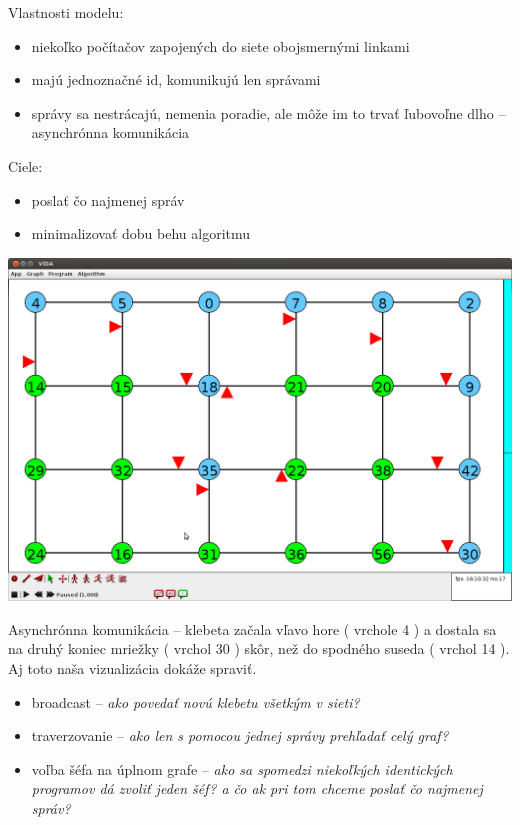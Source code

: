 
Vlastnosti modelu:
\begin{itemize}
    \item niekoľko počítačov zapojených do siete obojsmernými linkami
    \item majú jednoznačné id, komunikujú len správami
    \item správy sa nestrácajú, nemenia poradie, ale môže im to trvať ľubovoľne dlho -- asynchrónna
    komunikácia
\end{itemize}

Ciele:
\begin{itemize}
    \item poslať čo najmenej správ
    \item minimalizovať dobu behu algoritmu
\end{itemize}

\includegraphics[width=\columnwidth]{asyn}
\caption{Asynchrónna komunikácia -- klebeta začala vľavo hore ( vrchole 4 ) a dostala sa na druhý
koniec mriežky ( vrchol 30 ) skôr, než do spodného suseda ( vrchol 14 ). Aj toto naša vizualizácia
dokáže spraviť. }


\begin{itemize}

    \item broadcast -- \textit{ako povedať novú klebetu všetkým v sieti?}
    \item traverzovanie -- \textit{ako len s pomocou jednej správy prehľadať celý graf?}
    \item voľba šéfa na úplnom grafe -- \textit{ako sa spomedzi niekoľkých identických programov
    dá zvoliť jeden šéf? a čo ak pri tom chceme poslať čo najmenej správ?}

\end{itemize}

